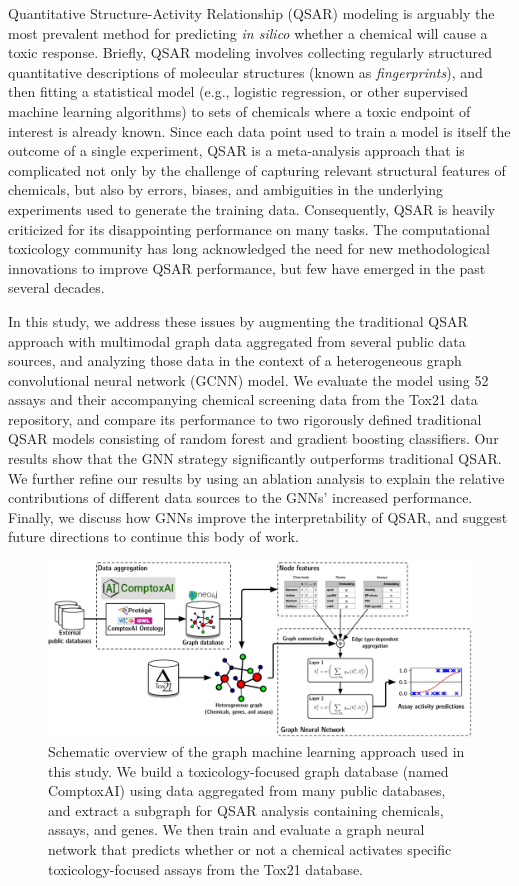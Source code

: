 \documentclass{ws-procs11x85}
\begin{document}
Quantitative Structure-Activity Relationship (QSAR) modeling is arguably the most prevalent method for predicting \textit{in silico} whether a chemical will cause a toxic response.
Briefly, QSAR modeling involves collecting regularly structured quantitative descriptions of molecular structures (known as \textit{fingerprints}), and then fitting a statistical model (e.g., logistic regression, or other supervised machine learning algorithms) to sets of chemicals where a toxic endpoint of interest is already known.
Since each data point used to train a model is itself the outcome of a single experiment, QSAR is a meta-analysis approach that is complicated not only by the challenge of capturing relevant structural features of chemicals, but also by errors, biases, and ambiguities in the underlying experiments used to generate the training data.
Consequently, QSAR is heavily criticized for its disappointing performance on many tasks.
The computational toxicology community has long acknowledged the need for new methodological innovations to improve QSAR performance, but few have emerged in the past several decades.

In this study, we address these issues by augmenting the traditional QSAR approach with multimodal graph data aggregated from several public data sources, and analyzing those data in the context of a heterogeneous graph convolutional neural network (GCNN) model.
We evaluate the model using 52 assays and their accompanying chemical screening data from the Tox21 data repository, and compare its performance to two rigorously defined traditional QSAR models consisting of random forest and gradient boosting classifiers.
Our results show that the GNN strategy significantly outperforms traditional QSAR.
We further refine our results by using an ablation analysis to explain the relative contributions of different data sources to the GNNs' increased performance.
Finally, we discuss how GNNs improve the interpretability of QSAR, and suggest future directions to continue this body of work.

\begin{figure}
   \centering
   \includegraphics[width=\textwidth]{figures/figure1.pdf}
   \caption{Schematic overview of the graph machine learning approach used in this study. We build a toxicology-focused graph database (named ComptoxAI) using data aggregated from many public databases, and extract a subgraph for QSAR analysis containing chemicals, assays, and genes. We then train and evaluate a graph neural network that predicts whether or not a chemical activates specific toxicology-focused assays from the Tox21 database.}
\end{figure}
\end{document}
